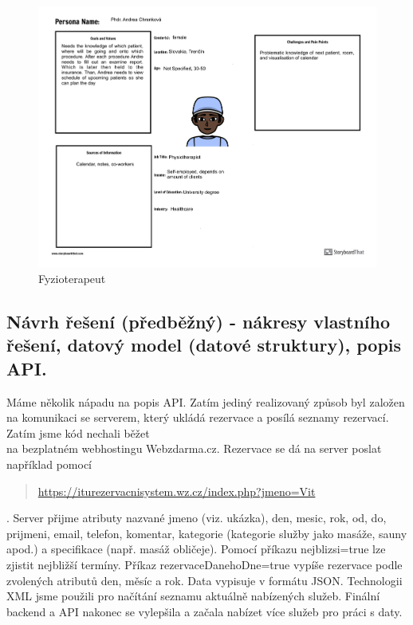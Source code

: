 \begin{figure}[h]
    \centering
    \includegraphics[width=1.4\textwidth, angle=270]{doc/latex/fig/vlado/Persona_Worksheets_PDF_dragged_3.pdf}
    \caption{Fyzioterapeut}
    \label{fig:pers_physio}
\end{figure}
\newpage



\subsection{Návrh řešení (předběžný) - nákresy vlastního řešení, datový model
    (datové struktury), popis API.}
Máme několik nápadu na popis API. Zatím jediný realizovaný způsob byl založen na komunikaci se serverem, který ukládá rezervace a posílá seznamy rezervací.
Zatím jsme kód nechali běžet\\ na bezplatném webhostingu Webzdarma.cz. Rezervace se dá na server poslat například pomocí \begin{quote}
    \href{https://iturezervacnisystem.wz.cz/index.php?jmeno=Vit}{https://iturezervacnisystem.wz.cz/index.php?jmeno=Vit}
\end{quote}. Server přijme atributy nazvané jmeno (viz. ukázka), den, mesic, rok, od, do, prijmeni, email, telefon, komentar, kategorie (kategorie služby jako masáže, sauny apod.) a specifikace (např. masáž obličeje). Pomocí příkazu nejblizsi=true lze zjistit nejbližší termíny. Příkaz rezervaceDanehoDne=true vypíše rezervace podle zvolených atributů den, měsíc a rok. Data vypisuje v formátu JSON. Technologii XML jsme použili pro načítání seznamu aktuálně nabízených služeb. Finální backend a API nakonec se vylepšila a začala nabízet více služeb pro práci s daty.

